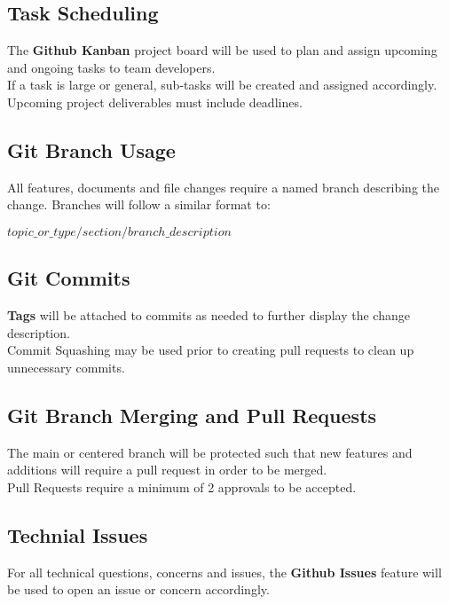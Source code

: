 \documentclass{article}
\begin{document}
	\subsection{Task Scheduling}
	The \textbf{Github Kanban} project board will be used to plan and assign upcoming and ongoing tasks to team developers. \\
	If a task is large or general, sub-tasks will be created and assigned accordingly.\\
	Upcoming project deliverables must include deadlines.\\
	
	\subsection{Git Branch Usage}
	All features, documents and file changes require a named branch describing the change.
	Branches will follow a similar format to:
	
	\begin{center}
		$topic\_or\_type/section/branch\_description$
	\end{center}
	
	\subsection{Git Commits}
	\textbf{Tags} will be attached to commits as needed to further display the change description.\\
	Commit Squashing may be used prior to creating pull requests to clean up unnecessary commits.
	
	\subsection{Git Branch Merging and Pull Requests}
	The main or centered branch will be protected such that new features and additions will require a pull request in order to be merged. \\
	Pull Requests require a minimum of 2 approvals to be accepted.
	
	\subsection{Technial Issues}
	For all technical questions, concerns and issues, the \textbf{Github Issues} feature will be used to open an issue or concern accordingly.
	
\end{document}
